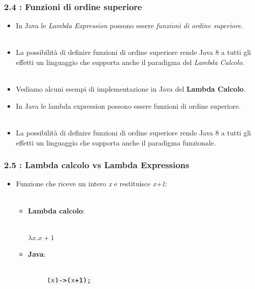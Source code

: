 \documentclass{beamer}
\begin{document}
\begin{frame}
	\frametitle{\textbf{2.4 : Funzioni di ordine superiore}}
	\begin{itemize}
		\item
			In Java le \textit{Lambda Expression} possono essere \textit{funzioni di ordine superiore}.\\\
		\item
			La possibilità di definire funzioni di ordine superiore rende Java 8 a tutti gli effetti un linguaggio che supporta anche il paradigma del \textit{Lambda Calcolo}.\\\	
		\item Vediamo alcuni esempi di implementazione in Java del \textbf{Lambda Calcolo}.
	\end{itemize}
	\begin{itemize}
		\item
			In Java le lambda expression possono essere funzioni di ordine superiore.\\\
		\item
			La possibilità di definire funzioni di ordine superiore rende Java 8 a tutti gli effetti un linguaggio che supporta anche il paradigma funzionale.
	\end{itemize}
\end{frame}


\begin{frame}
	\frametitle{\textbf{2.5 : Lambda calcolo vs Lambda Expressions}}
	\begin{itemize}
		\item
			Funzione che riceve un intero \textit{x} e restituisce \textit{x+1}:\\\
		\begin{itemize}
			\item 
				\textbf{Lambda calcolo}:\\\
				\begin{center} 
					$\lambda x.x+1$ 
				\end{center}
			\item 
				\textbf{Java}:\\\
				\begin{figure}
					\centering
					\includegraphics[width=0.3\linewidth]{image/identity.png}
					\label{fig:identity}
				\end{figure}
		\end{itemize}
	\end{itemize}
\end{frame}
\end{document}
